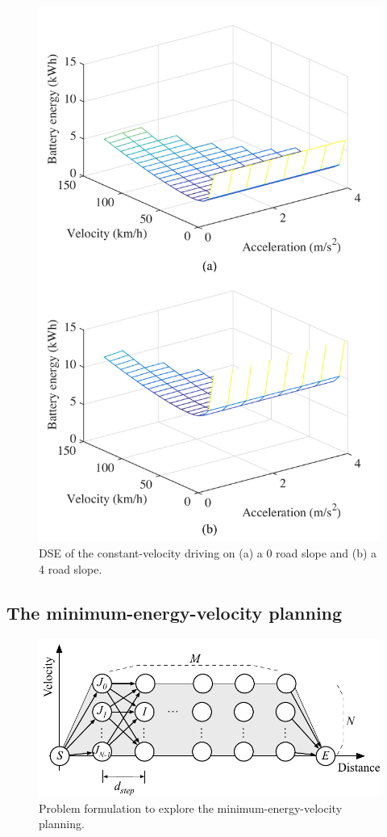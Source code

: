 \documentclass{IEEEtran}
\begin{document}
\begin{figure} %
\centering
\includegraphics[width=0.95\hsize]{Figures/Design_space_exploration.pdf}
\caption{DSE of  the constant-velocity driving on (a) a 0 road slope and (b) a 4 road slope.}
\label{fig:DSE}
\end{figure} 

\subsection{The minimum-energy-velocity planning} \label{subsec:variable drive}

\begin{figure} [h]%
\includegraphics[width=1.0\hsize]{Figures/Opt_drive_problem.pdf}
\caption{Problem formulation to explore the minimum-energy-velocity planning.}
\label{fig:Opt_drive_problem}
\end{figure}
\end{document}
